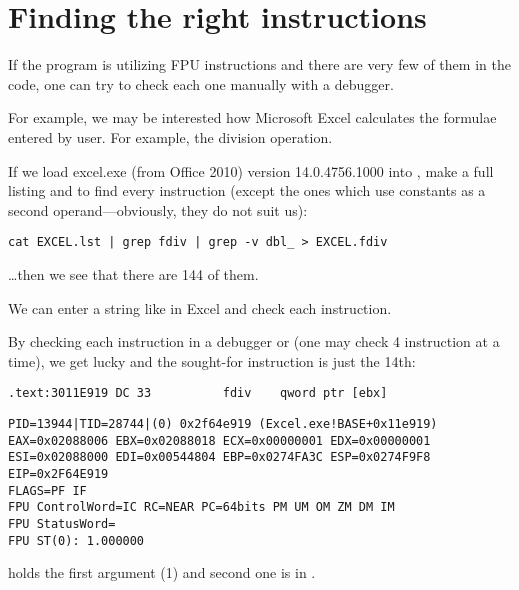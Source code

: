 \section{Finding the right instructions}

If the program is utilizing FPU instructions and there are very few of them in the code,
one can try to check each one manually with a debugger.

\par For example, we may be interested how Microsoft Excel calculates the formulae entered by user.
For example, the division operation.

\myindex{\GrepUsage}

If we load excel.exe (from Office 2010) version 14.0.4756.1000 into \IDA, make a full listing
and to find every \FDIV instruction (except the ones which use constants as a second 
operand---obviously, they do not suit us):

\begin{lstlisting}
cat EXCEL.lst | grep fdiv | grep -v dbl_ > EXCEL.fdiv
\end{lstlisting}

\dots then we see that there are 144 of them.

\par We can enter a string like  in Excel and check each instruction.


\par By checking each instruction in a debugger or \tracer
(one may check 4 instruction at a time),
we get lucky and the sought-for instruction is just the 14th:

\begin{lstlisting}[style=customasmx86]
.text:3011E919 DC 33          fdiv    qword ptr [ebx]
\end{lstlisting}

\begin{lstlisting}
PID=13944|TID=28744|(0) 0x2f64e919 (Excel.exe!BASE+0x11e919)
EAX=0x02088006 EBX=0x02088018 ECX=0x00000001 EDX=0x00000001
ESI=0x02088000 EDI=0x00544804 EBP=0x0274FA3C ESP=0x0274F9F8
EIP=0x2F64E919
FLAGS=PF IF
FPU ControlWord=IC RC=NEAR PC=64bits PM UM OM ZM DM IM 
FPU StatusWord=
FPU ST(0): 1.000000
\end{lstlisting}

 holds the first argument (1) and second one is in \TT{[EBX]}.\\
\\

